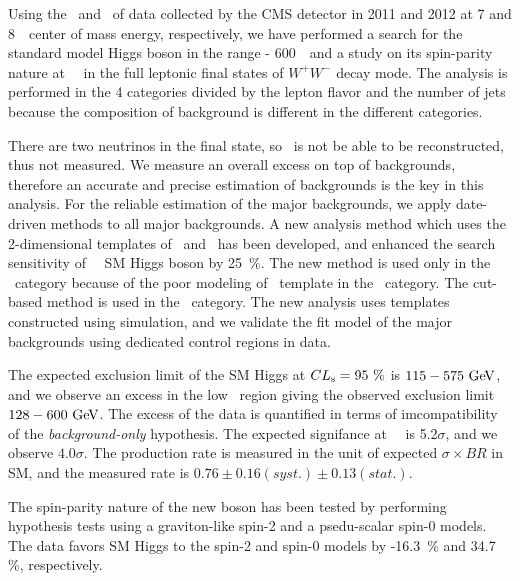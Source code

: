 Using the \intlumiSevenTeV\ and \intlumiEightTeV\ of data collected by the CMS detector 
in 2011 and 2012 at 7 and 8~\TeV\ center of mass energy, respectively, we have performed 
a search for the standard model Higgs boson in the range  - 600~\GeV\ 
and a study on its spin-parity nature at ~\GeV\ 
in the full leptonic final states of $W^+W^-$ decay mode. 
The analysis is performed in the 4 categories divided by the lepton flavor and the 
number of jets because the composition of background is different
in the different categories. 

There are two neutrinos in the final state, so \mHi\ is not be able to be reconstructed, 
thus not measured. We measure an overall excess on top of backgrounds, 
therefore an accurate and precise 
estimation of backgrounds is the key in this analysis. For the reliable estimation 
of the major backgrounds, we apply date-driven methods to all major backgrounds. 
%
A new analysis method which uses the 2-dimensional templates of \mT\ and \mll\ has been developed,
and enhanced the search sensitivity of ~\GeV\ SM Higgs boson by 25~\%. 
The new method is used only in the \DF\ category because of the poor modeling of \dyll\
template in the \SF\ category. The cut-based method is used in the \SF\ category.
%
The new analysis uses templates constructed using simulation, and we 
validate the fit model of the major backgrounds using dedicated control 
regions in data. 

The expected exclusion limit of the SM Higgs at $CL_\mathrm{s}=95~\%$ is $115-575~\mathrm{Ge\kern -0.1em V}$, 
and we observe an excess in the low \mHi\ region giving the observed exclusion 
limit $128-600~\mathrm{Ge\kern -0.1em V}$. 
The excess of the data is quantified in terms of imcompatibility of the 
\textit{background-only} hypothesis. The expected signifance at \mHi=125~\GeV\ 
is 5.2$\sigma$, and we observe $4.0\sigma$.
The production rate is measured in the unit of expected $\sigma \times BR$ in SM, 
and the measured rate is $0.76 \pm 0.16(syst.) \pm 0.13(stat.)$.  

The spin-parity nature of the new boson has been tested by performing hypothesis 
tests using a graviton-like spin-2 and a psedu-scalar spin-0 models. The data 
favors SM Higgs to the spin-2 and spin-0 models by \CLs=0.2-16.3~\% and 34.7 \%, 
respectively.
\\

